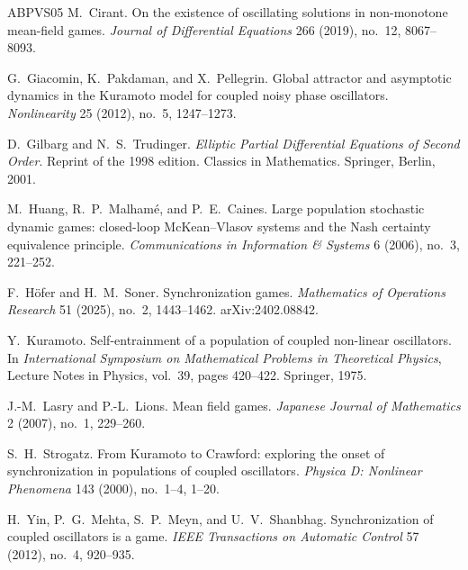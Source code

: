 \documentclass{amsart}
\begin{document}
\begin{thebibliography}{ABPVS05}
M.~Cirant.
\newblock On the existence of oscillating solutions in non-monotone
  mean-field games.
\newblock \emph{Journal of Differential Equations} 266 (2019), no.\ 12,
  8067--8093.

G.~Giacomin, K.~Pakdaman, and X.~Pellegrin.
\newblock Global attractor and asymptotic dynamics in the {K}uramoto
  model for coupled noisy phase oscillators.
\newblock \emph{Nonlinearity} 25 (2012), no.\ 5, 1247--1273.

D.~Gilbarg and N.~S.~Trudinger.
\newblock \emph{Elliptic Partial Differential Equations of Second Order}.
\newblock Reprint of the 1998 edition. Classics in Mathematics.
Springer, Berlin, 2001.

M.~Huang, R.~P.~Malham\'e, and P.~E.~Caines.
\newblock Large population stochastic dynamic games: closed-loop
  {M}c{K}ean--{V}lasov systems and the {N}ash certainty equivalence
  principle.
\newblock \emph{Communications in Information \& Systems} 6 (2006),
  no.\ 3, 221--252.

F.~H\"ofer and H.~M.~Soner.
\newblock Synchronization games.
\newblock \emph{Mathematics of Operations Research} 51 (2025),
  no.\ 2, 1443--1462. arXiv:2402.08842.

Y.~Kuramoto.
\newblock Self-entrainment of a population of coupled non-linear
  oscillators.
\newblock In \emph{International Symposium on Mathematical Problems in
  Theoretical Physics}, Lecture Notes in Physics, vol.\ 39, pages
  420--422. Springer, 1975.

J.-M.~Lasry and P.-L.~Lions.
\newblock Mean field games.
\newblock \emph{Japanese Journal of Mathematics} 2 (2007), no.\ 1,
  229--260.

S.~H.~Strogatz.
\newblock From {K}uramoto to {C}rawford: exploring the onset of
  synchronization in populations of coupled oscillators.
\newblock \emph{Physica D: Nonlinear Phenomena} 143 (2000), no.\ 1--4,
  1--20.

H.~Yin, P.~G.~Mehta, S.~P.~Meyn, and U.~V.~Shanbhag.
\newblock Synchronization of coupled oscillators is a game.
\newblock \emph{IEEE Transactions on Automatic Control} 57 (2012),
  no.\ 4, 920--935.

\end{thebibliography}
\end{document}
